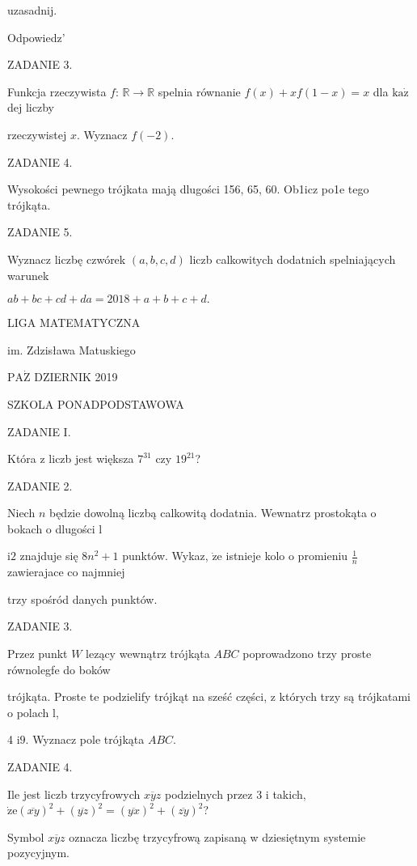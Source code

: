 \documentclass[a4paper,12pt]{article}
\begin{document}
uzasadnij.

Odpowiedz'

ZADANIE 3.

Funkcja rzeczywista $f$: $\mathbb{R} \rightarrow \mathbb{R}$ spelnia równanie $f(x)+xf(1-x) = x$ dla $\mathrm{k}\mathrm{a}\dot{\mathrm{z}}$ dej liczby

rzeczywistej $x$. Wyznacz $f(-2).$

ZADANIE 4.

Wysokości pewnego trójkata mają dlugości 156, 65, 60. Ob1icz po1e tego trójkąta.

ZADANIE 5.

Wyznacz liczbę czwórek $(a,b,c,d)$ liczb calkowitych dodatnich spelniających warunek

$ab+bc+cd+da=2018+a+b+c+d.$






LIGA MATEMATYCZNA

im. Zdzisława Matuskiego

$\mathrm{P}\mathrm{A}\dot{\mathrm{Z}}$ DZIERNIK 2019

SZKOLA PONADPODSTAWOWA

ZADANIE I.

Która z liczb jest większa $7^{31}$ czy $19^{21}$?

ZADANIE 2.

Niech $n$ będzie dowolną liczbą calkowitą dodatnia. Wewnatrz prostokąta o bokach o dlugości l

$\mathrm{i}2$ znajduje się $8n^{2}+1$ punktów. Wykaz, $\dot{\mathrm{z}}\mathrm{e}$ istnieje kolo o promieniu $\displaystyle \frac{1}{n}$ zawierajace co najmniej

trzy spośród danych punktów.

ZADANIE 3.

Przez punkt $W$ lezący wewnątrz trójkąta $ABC$ poprowadzono trzy proste równolegfe do boków

trójkąta. Proste te podzielify trójkąt na sześć części, z których trzy są trójkatami o polach l,

4 $\mathrm{i}9$. Wyznacz pole trójkąta $ABC.$

ZADANIE 4.

Ile jest liczb trzycyfrowych $\overline{xyz}$ podzielnych przez 3 i takich, $\dot{\mathrm{z}}\mathrm{e}(\overline{xy})^{2}+(\overline{yz})^{2}=(\overline{yx})^{2}+(\overline{zy})^{2}$?

Symbol $\overline{xyz}$ oznacza liczbę trzycyfrową zapisaną w dziesiętnym systemie pozycyjnym.
\end{document}
